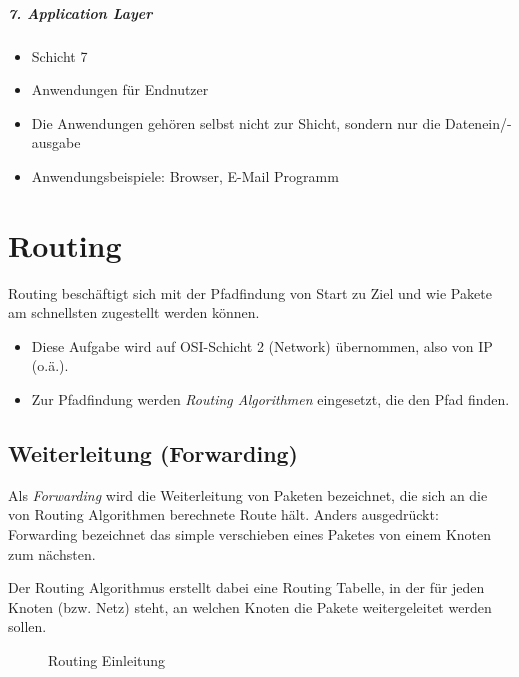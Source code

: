     \paragraph{7. Application Layer}
        \begin{itemize}
        	\item Schicht 7
        	\item Anwendungen für Endnutzer
        	\item Die Anwendungen gehören selbst nicht zur Shicht, sondern nur die Datenein/-ausgabe
        	\item Anwendungsbeispiele: Browser, E-Mail Programm
        \end{itemize}

\chapter{Routing}
    Routing beschäftigt sich mit der Pfadfindung von Start zu Ziel und wie Pakete am schnellsten zugestellt werden können.
    \begin{itemize}
    	\item Diese Aufgabe wird auf OSI-Schicht 2 (Network) übernommen, also von IP (o.ä.).
    	\item Zur Pfadfindung werden \textit{Routing Algorithmen} eingesetzt, die den Pfad finden.
    \end{itemize}

    \section{Weiterleitung (Forwarding)}
        Als \textit{Forwarding} wird die Weiterleitung von Paketen bezeichnet, die sich an die von Routing Algorithmen berechnete Route hält. Anders ausgedrückt: Forwarding bezeichnet das simple verschieben eines Paketes von einem Knoten zum nächsten.
        
        Der Routing Algorithmus erstellt dabei eine Routing Tabelle, in der für jeden Knoten (bzw. Netz) steht, an welchen Knoten die Pakete weitergeleitet werden sollen.
        
        \begin{figure}[H]
		    \centering
            \caption{Routing Einleitung}
        \end{figure}

